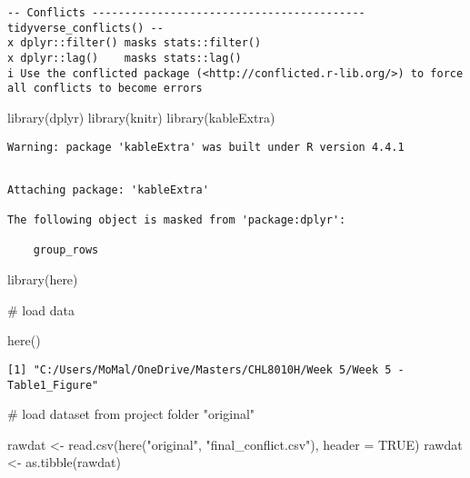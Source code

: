 \documentclass[
  letterpaper,
  DIV=11,
  numbers=noendperiod]{scrartcl}
\newenvironment{Shaded}{\begin{snugshade}}{\end{snugshade}}
\newcommand{\AttributeTok}[1]{\textcolor[rgb]{0.40,0.45,0.13}{#1}}
\newcommand{\CommentTok}[1]{\textcolor[rgb]{0.37,0.37,0.37}{#1}}
\newcommand{\ConstantTok}[1]{\textcolor[rgb]{0.56,0.35,0.01}{#1}}
\newcommand{\FunctionTok}[1]{\textcolor[rgb]{0.28,0.35,0.67}{#1}}
\newcommand{\NormalTok}[1]{\textcolor[rgb]{0.00,0.23,0.31}{#1}}
\newcommand{\OtherTok}[1]{\textcolor[rgb]{0.00,0.23,0.31}{#1}}
\newcommand{\StringTok}[1]{\textcolor[rgb]{0.13,0.47,0.30}{#1}}
\begin{document}
\begin{verbatim}
-- Conflicts ------------------------------------------ tidyverse_conflicts() --
x dplyr::filter() masks stats::filter()
x dplyr::lag()    masks stats::lag()
i Use the conflicted package (<http://conflicted.r-lib.org/>) to force all conflicts to become errors
\end{verbatim}

\begin{Shaded}
\begin{Highlighting}[]
\FunctionTok{library}\NormalTok{(dplyr)}
\FunctionTok{library}\NormalTok{(knitr)}
\FunctionTok{library}\NormalTok{(kableExtra)}
\end{Highlighting}
\end{Shaded}

\begin{verbatim}
Warning: package 'kableExtra' was built under R version 4.4.1
\end{verbatim}

\begin{verbatim}

Attaching package: 'kableExtra'

The following object is masked from 'package:dplyr':

    group_rows
\end{verbatim}

\begin{Shaded}
\begin{Highlighting}[]
\FunctionTok{library}\NormalTok{(here)}

\CommentTok{\# load data }

\FunctionTok{here}\NormalTok{()}
\end{Highlighting}
\end{Shaded}

\begin{verbatim}
[1] "C:/Users/MoMal/OneDrive/Masters/CHL8010H/Week 5/Week 5 - Table1_Figure"
\end{verbatim}

\begin{Shaded}
\begin{Highlighting}[]
\CommentTok{\# load dataset from project folder "original"}

\NormalTok{rawdat }\OtherTok{\textless{}{-}} \FunctionTok{read.csv}\NormalTok{(}\FunctionTok{here}\NormalTok{(}\StringTok{"original"}\NormalTok{, }\StringTok{"final\_conflict.csv"}\NormalTok{), }\AttributeTok{header =} \ConstantTok{TRUE}\NormalTok{)}
\NormalTok{rawdat }\OtherTok{\textless{}{-}} \FunctionTok{as.tibble}\NormalTok{(rawdat)}
\end{Highlighting}
\end{Shaded}
\end{document}
